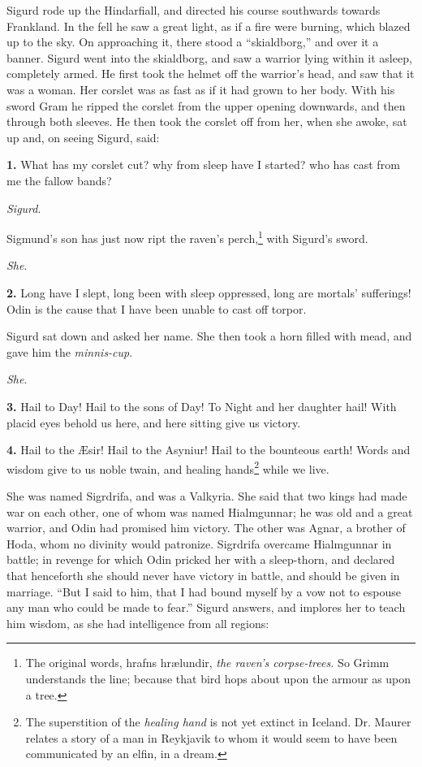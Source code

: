 
Sigurd rode up the Hindarfiall, and directed his course southwards
towards Frankland. In the fell he saw a great light, as if a fire were
burning, which blazed up to the sky. On approaching it, there stood a
``skialdborg,'' and over it a banner. Sigurd went into the skialdborg,
and saw a warrior lying within it asleep, completely armed. He first
took the helmet off the warrior's head, and saw that it was a woman.
Her corslet was as fast as if it had grown to her body. With his sword
Gram he ripped the corslet from the upper opening downwards, and then
through both sleeves. He then took the corslet off from her, when she
awoke, sat up and, on seeing Sigurd, said:

\textbf{1.} What has my corslet cut? why from sleep have I started? who has
cast from me the fallow bands?

\emph{Sigurd}.

Sigmund's son has just now ript the raven's perch,\footnote{The original words, hrafns hrælundir, \emph{the raven's
corpse-trees.} So Grimm understands the line; because that bird hops
about upon the armour as upon a tree.} with Sigurd's
sword.

\emph{She}.

\textbf{2.} Long have I slept, long been with sleep oppressed, long are
mortals' sufferings! Odin is the cause that I have been unable to cast
off torpor.

Sigurd sat down and asked her name. She then took a horn filled with
mead, and gave him the \emph{minnis-cup}.

\emph{She}.

\textbf{3.} Hail to Day! Hail to the sons of Day! To Night and her daughter
hail! With placid eyes behold us here, and here sitting give us
victory.

\textbf{4.} Hail to the Æsir! Hail to the Asyniur! Hail to the bounteous
earth! Words and wisdom give to us noble twain, and healing hands\footnote{The superstition of the \emph{healing hand} is not yet
extinct in Iceland. Dr. Maurer relates a story of a man in Reykjavik
to whom it would seem to have been communicated by an elfin, in a
dream.}
while we live.

She was named Sigrdrifa, and was a Valkyria. She said that two kings
had made war on each other, one of whom was named Hialmgunnar; he was
old and a great warrior, and Odin had promised him victory. The other
was Agnar, a brother of Hoda, whom no divinity would patronize.
Sigrdrifa overcame Hialmgunnar in battle; in revenge for which Odin
pricked her with a sleep-thorn, and declared that henceforth she
should never have victory in battle, and should be given in marriage.
``But I said to him, that I had bound myself by a vow not to espouse
any man who could be made to fear.'' Sigurd answers, and implores her
to teach him wisdom, as she had intelligence from all regions:

